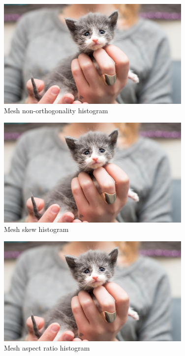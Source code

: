 \begin{figure}[h!]
\centering %
\includegraphics[width=0.85\textwidth]{Pictures/kitten-placeholder.jpg}
\caption{Mesh non-orthogonality histogram}
\label{mesh-ortho}
\end{figure}

\begin{figure}[h!]
\centering %
\includegraphics[width=0.85\textwidth]{Pictures/kitten-placeholder.jpg}
\caption{Mesh skew histogram}
\label{mesh-skew}
\end{figure}

\begin{figure}[h!]
\centering %
\includegraphics[width=0.85\textwidth]{Pictures/kitten-placeholder.jpg}
\caption{Mesh aspect ratio histogram}
\label{mesh-aspect}
\end{figure}

